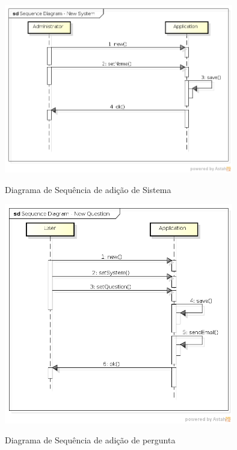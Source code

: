 	\begin{figure}[!htb]
		\caption{Diagrama de Sequência de adição de Sistema}
		{\parbox{6cm}{
				\includegraphics[width=10cm]{images/SequenceDiagramNewSystem.png}
				\label{SeqSystem}
		}}
	\end{figure}

	\begin{figure}[!htb]
		\caption{Diagrama de Sequência de adição de pergunta}
		{\parbox{6cm}{
				\includegraphics[width=10cm]{images/SequenceDiagramNewQuestion.png}
				\label{SeqQuestion}
		}}
	\end{figure}